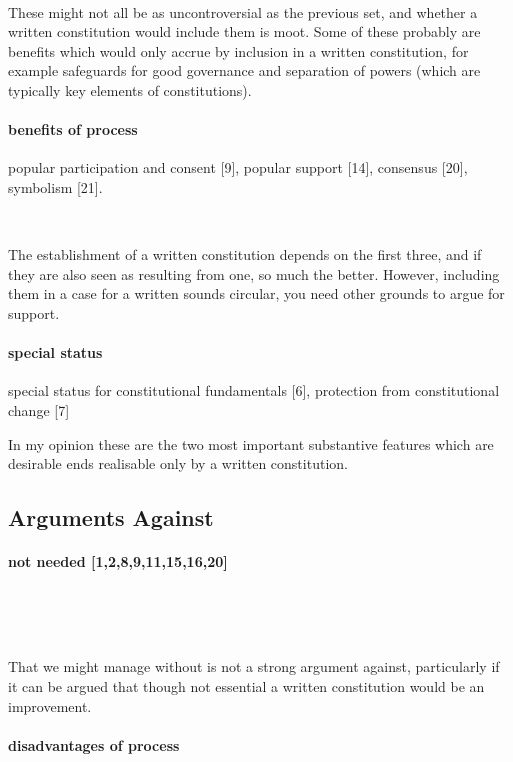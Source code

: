 \documentclass[14pt,titlepage]{extarticle}
\begin{document}
\ 

These might not all be as uncontroversial as the previous set, and whether a written constitution would include them is moot.
Some of these probably are benefits which would only accrue by inclusion in a written constitution, for example safeguards for good governance and separation of powers (which are typically key elements of constitutions).

\paragraph{benefits of process}
popular participation and consent [9], popular support [14], consensus [20], symbolism [21].

\

The establishment of a written constitution depends on the first three, and if they are also seen as resulting from one, so much the better.
However, including them in a case for a written sounds circular, you need other grounds to argue for support.

\paragraph{special status}

special status for constitutional fundamentals [6], protection from constitutional change [7]

In my opinion these are the two most important substantive features which are desirable ends realisable only by a written constitution.

\subsection{Arguments Against}

\paragraph{not needed [1,2,8,9,11,15,16,20]}

\

\

That we might manage without is not a strong argument against, particularly if it can be argued that though not essential a written constitution would be an improvement.

\paragraph{disadvantages of process}
\end{document}
